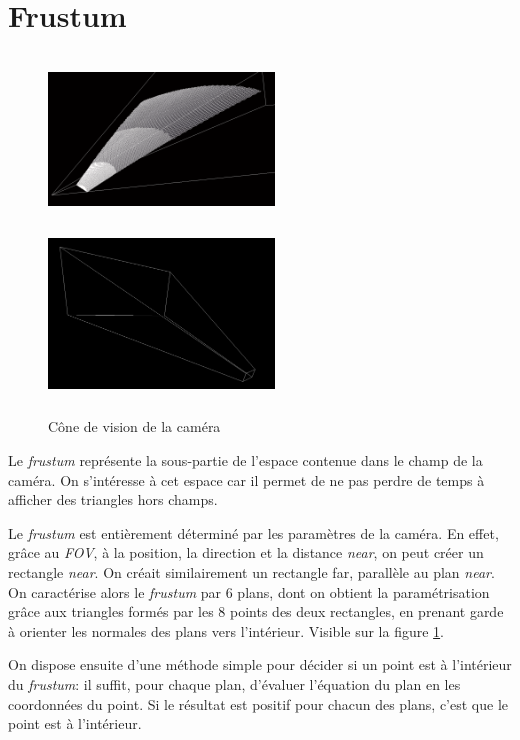   
  \section{Frustum}
  \label{sec:Frustum}
  \begin{figure}[H]
  \centerline{
  \includegraphics[width=6cm,height=4.5cm]{img/culling.png}
  \includegraphics[width=6cm,height=4.5cm]{img/frustumbox.png}}
  \caption{Cône de vision de la caméra \protect\footnotemark}
  \label{fig:culling}
  \end{figure}
  
  Le \textit{frustum} représente la sous-partie de l'espace contenue dans le champ de la caméra. On s'intéresse à cet espace car il permet de ne pas perdre de temps à afficher des triangles hors champs.
  
  

 
  Le \emph{frustum} est entièrement déterminé par les paramètres de la caméra.  
  En effet, grâce au \textit{FOV}, à la position, la direction et la distance \emph{near}, on peut créer un rectangle \emph{near}. On créait similairement un rectangle far, parallèle au plan \emph{near}. On caractérise alors le \emph{frustum} par 6 plans, dont on obtient la paramétrisation grâce aux triangles formés par les 8 points des deux rectangles, en prenant garde à orienter les normales des plans vers l'intérieur. Visible sur la figure \ref{fig:culling}.
  
  On dispose ensuite d'une méthode simple pour décider si un point est à l'intérieur du \emph{frustum}: il suffit, pour chaque plan, d'évaluer l'équation du plan en les coordonnées du point. Si le résultat est positif pour chacun des plans, c'est que le point est à l'intérieur.
  
